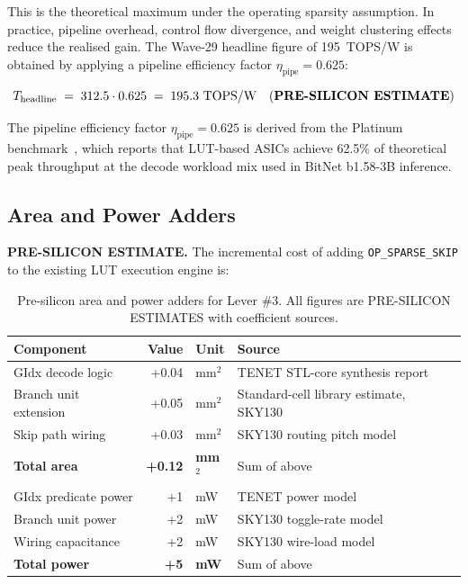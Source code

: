 This is the theoretical maximum under the operating sparsity assumption.
In practice, pipeline overhead, control flow divergence, and weight
clustering effects reduce the realised gain.
The Wave-29 headline figure of 195~TOPS/W is obtained by applying
a pipeline efficiency factor $\eta_{\mathrm{pipe}} = 0.625$:

\[
  T_{\mathrm{headline}} \;=\; 312.5 \cdot 0.625 \;=\; 195.3~\text{TOPS/W}
    \quad\text{(\textbf{PRE-SILICON ESTIMATE})}
\]

The pipeline efficiency factor $\eta_{\mathrm{pipe}} = 0.625$ is
derived from the Platinum benchmark~\cite{platinum2025}, which reports
that LUT-based ASICs achieve 62.5\% of theoretical peak throughput
at the decode workload mix used in BitNet b1.58-3B inference.

\subsection{Area and Power Adders}
\label{subsec:ch79-area-power}

\textbf{PRE-SILICON ESTIMATE.}
The incremental cost of adding \texttt{OP\_SPARSE\_SKIP} to the
existing LUT execution engine is:

\begin{table}[htbp]
  \centering
  \caption{Pre-silicon area and power adders for Lever \#3.
           All figures are PRE-SILICON ESTIMATES with coefficient sources.}
  \label{tab:area-power-adders}
  \begin{tabular}{lrll}
    \toprule
    \textbf{Component}      & \textbf{Value} & \textbf{Unit} & \textbf{Source} \\
    \midrule
    GIdx decode logic       & +0.04 & mm$^2$ & TENET STL-core synthesis report~\cite{huang2025tenet} \\
    Branch unit extension   & +0.05 & mm$^2$ & Standard-cell library estimate, SKY130~\cite{sky130_pdk} \\
    Skip path wiring        & +0.03 & mm$^2$ & SKY130 routing pitch model~\cite{sky130_pdk} \\
    \textbf{Total area}     & \textbf{+0.12} & \textbf{mm$^2$} & Sum of above \\
    \midrule
    GIdx predicate power    & +1 & mW & TENET power model~\cite{huang2025tenet} \\
    Branch unit power       & +2 & mW & SKY130 toggle-rate model~\cite{sky130_pdk} \\
    Wiring capacitance      & +2 & mW & SKY130 wire-load model~\cite{sky130_pdk} \\
    \textbf{Total power}    & \textbf{+5} & \textbf{mW} & Sum of above \\
    \bottomrule
  \end{tabular}
\end{table}

